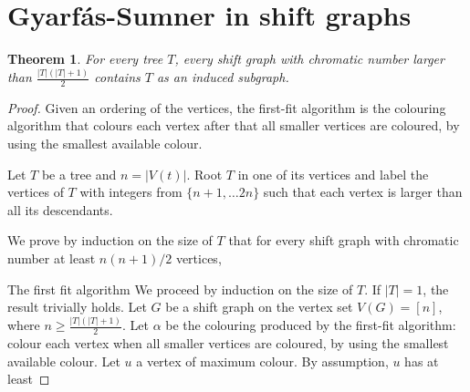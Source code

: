 \documentclass[11pt,a4aper]{article}
\newtheorem{theorem}{Theorem}
\renewcommand{\ge}{\geqslant}
\begin{document}
\section{Gyarf\'as-Sumner in shift graphs}
\begin{theorem}
  For every tree $T$, every shift graph with chromatic number larger than $\frac{|T|(|T|+1)}2$ contains $T$ as an induced subgraph. 
\end{theorem}
\begin{proof}
  Given an ordering of the vertices, the first-fit algorithm is the colouring
  algorithm that colours each vertex after that all smaller vertices are
  coloured, by using the smallest available colour.

  Let $T$ be a tree and $n = |V(t)|$. Root $T$ in one of its vertices and label
  the vertices of $T$ with integers from $\{n+1, \dots 2n\}$ such that each vertex is larger
  than all its descendants.

  We prove by induction on the size of $T$ that for every shift graph with
  chromatic number at least  $n(n+1)/2$
  vertices, 

  The first fit algorithm 
  We proceed by induction on the size of $T$. If $|T| = 1$, the result
  trivially holds. Let $G$ be a shift graph on the vertex set $V(G) = [n]$,
  where $n \ge\frac{|T|(|T|+1)}2$. Let $\alpha$ be the colouring produced by the
  first-fit algorithm: colour each vertex when all smaller vertices are
  coloured, by using the smallest available colour. Let $u$ a vertex of maximum
  colour. By assumption, $u$ has at least 
\end{proof}




\end{document}
